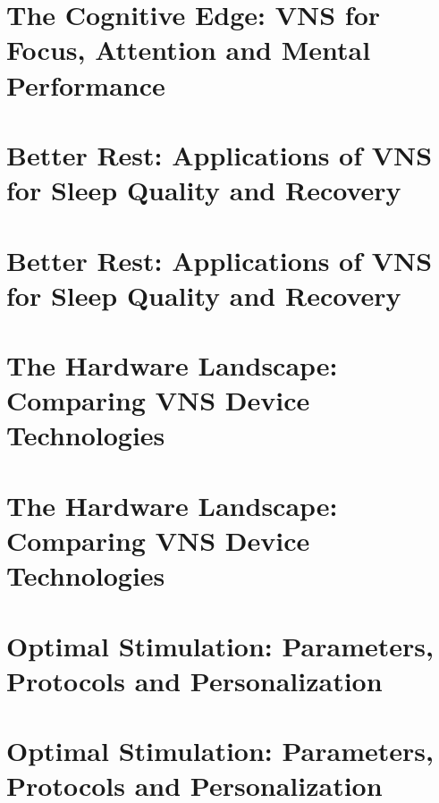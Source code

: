 \documentclass[
  Letterpaper,
]{scrbook}
\begin{document}

\chapter{The Cognitive Edge: VNS for Focus, Attention and Mental
Performance}\label{the-cognitive-edge-vns-for-focus-attention-and-mental-performance-1}


\chapter{Better Rest: Applications of VNS for Sleep Quality and
Recovery}\label{better-rest-applications-of-vns-for-sleep-quality-and-recovery}


\chapter{Better Rest: Applications of VNS for Sleep Quality and
Recovery}\label{better-rest-applications-of-vns-for-sleep-quality-and-recovery-1}


\chapter{The Hardware Landscape: Comparing VNS Device
Technologies}\label{the-hardware-landscape-comparing-vns-device-technologies}


\chapter{The Hardware Landscape: Comparing VNS Device
Technologies}\label{the-hardware-landscape-comparing-vns-device-technologies-1}


\chapter{Optimal Stimulation: Parameters, Protocols and
Personalization}\label{optimal-stimulation-parameters-protocols-and-personalization}


\chapter{Optimal Stimulation: Parameters, Protocols and
Personalization}\label{optimal-stimulation-parameters-protocols-and-personalization-1}
\end{document}
